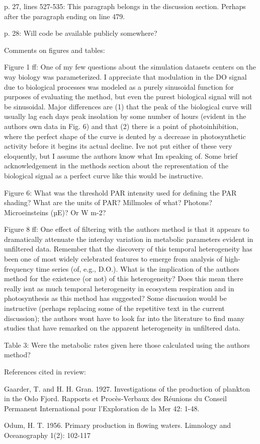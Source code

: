 \documentclass[letterpaper,12pt]{article}\usepackage[]{graphicx}\usepackage[]{color}
\begin{document}
p. 27, lines 527-535: This paragraph belongs in the discussion section. Perhaps after the paragraph ending on line 479.

p. 28: Will code be available publicly somewhere?

Comments on figures and tables:

Figure 1 ff: One of my few questions about the simulation datasets centers on the way biology was parameterized. I appreciate that modulation in the DO signal due to biological processes was modeled as a purely sinusoidal function for purposes of evaluating the method, but even the purest biological signal will not be sinusoidal. Major differences are (1) that the peak of the biological curve will usually lag each days peak insolation by some number of hours (evident in the authors own data in Fig. 6) and that (2) there is a point of photoinhibition, where the perfect shape of the curve is dented by a decrease in photosynthetic activity before it begins its actual decline. Ive not put either of these very eloquently, but I assume the authors know what Im speaking of. Some brief acknowledgement in the methods section about the representation of the biological signal as a perfect curve like this would be instructive.

Figure 6: What was the threshold PAR intensity used for defining the PAR shading? What are the units of PAR? Millmoles of what? Photons? Microeinsteins (µE)? Or W m-2?
 
Figure 8 ff: One effect of filtering with the authors method is that it appears to dramatically attenuate the interday variation in metabolic parameters evident in unfiltered data. Remember that the discovery of this temporal heterogeneity has been one of most widely celebrated features to emerge from analysis of high-frequency time series (of, e.g., D.O.). What is the implication of the authors method for the existence (or not) of this heterogeneity? Does this mean there really isnt as much temporal heterogeneity in ecosystem respiration and in photosynthesis as this method has suggested? Some discussion would be instructive (perhaps
replacing some of the repetitive text in the current discussion); the authors wont have to look far into the literature to find many studies that have remarked on the apparent heterogeneity in unfiltered data.

Table 3: Were the metabolic rates given here those calculated using the authors method?

References cited in review:

Gaarder, T. and H. H. Gran. 1927. Investigations of the production of plankton in the Oslo Fjord. Rapports et Procès-Verbaux des Réunions du Conseil Permanent International pour l'Exploration de la Mer 42: 1-48.

Odum, H. T. 1956. Primary production in flowing waters. Limnology and Oceanography 1(2):
102-117
\end{document}
